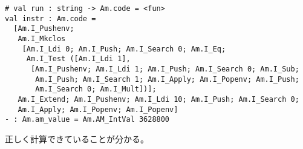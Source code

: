 \documentclass[a4paper,9pt]{jsarticle}
\begin{document}
\begin{lstlisting}
# val run : string -> Am.code = <fun>
val instr : Am.code =
  [Am.I_Pushenv;
   Am.I_Mkclos
    [Am.I_Ldi 0; Am.I_Push; Am.I_Search 0; Am.I_Eq;
     Am.I_Test ([Am.I_Ldi 1],
      [Am.I_Pushenv; Am.I_Ldi 1; Am.I_Push; Am.I_Search 0; Am.I_Sub;
       Am.I_Push; Am.I_Search 1; Am.I_Apply; Am.I_Popenv; Am.I_Push;
       Am.I_Search 0; Am.I_Mult])];
   Am.I_Extend; Am.I_Pushenv; Am.I_Ldi 10; Am.I_Push; Am.I_Search 0;
   Am.I_Apply; Am.I_Popenv; Am.I_Popenv]
- : Am.am_value = Am.AM_IntVal 3628800
\end{lstlisting}

正しく計算できていることが分かる。
\end{document}
